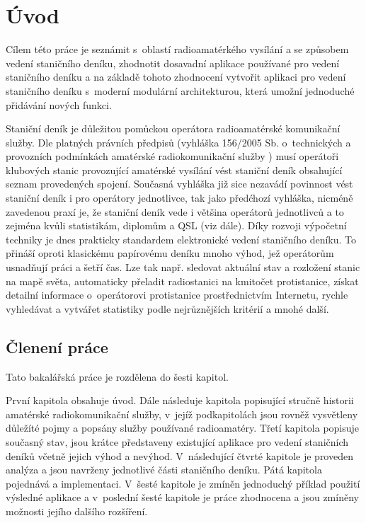 \chapter{Úvod}
\label{uvod}

Cílem této práce je seznámit s~oblastí radioamatérkého vysílání a se způsobem vedení staničního deníku,
zhodnotit dosavadní aplikace používané pro vedení staničního deníku a 
na základě tohoto zhodnocení vytvořit aplikaci pro vedení staničního deníku s~moderní modulární architekturou,
která umožní jednoduché přidávání nových funkci.

Staniční deník je důležitou pomůckou operátora radioamatérské komunikační
služby. Dle platných právních předpisů (vyhláška 156/2005 Sb. o~technických a
provozních podmínkách amatérské radiokomunikační služby \cite{vyhlaska})
musí operátoři klubových stanic provozující amatérské vysílání
vést staniční deník obsahující seznam provedených spojení.
Současná vyhláška již sice nezavádí povinnost vést staniční deník i pro
operátory jednotlivce, tak jako předćhozí vyhláška, 
nicméně zavedenou praxí je, že staniční deník vede i většina operátorů
jednotlivců a to zejména kvůli statistikám, diplomům a QSL (viz dále).
Díky rozvoji výpočetní techniky je dnes prakticky standardem
elektronické vedení staničního deníku.
To přináší oproti klasickému papírovému deníku mnoho výhod, jež
operátorům usnadňují práci a šetří čas. Lze tak např. sledovat aktuální stav a
rozložení stanic na mapě světa, automaticky přeladit radiostanici na kmitočet
protistanice, získat detailní informace o~operátorovi protistanice
prostřednictvím Internetu, rychle vyhledávat a vytvářet statistiky podle nejrůznějších kritérií a
mnohé další.

\section{Členení práce}

Tato bakalářská  práce je rozdělena do šesti kapitol.

První kapitola obsahuje úvod. Dále následuje kapitola popisující stručně historii amatérské radiokomunikační služby,
v~jejíž podkapitolách jsou rovněž vysvětleny důležíté pojmy a popsány služby používané radioamatéry.
Třetí kapitola popisuje současný stav, jsou krátce představeny existující
aplikace pro vedení staničních deníků včetně jejich výhod a nevýhod.
V~následující čtvrté kapitole je proveden analýza a jsou navrženy jednotlivé části staničního deníku.
Pátá kapitola pojednává a implementaci. V~šesté kapitole je zmíněn jednoduchý příklad použití výsledné aplikace
 a v~poslední šesté kapitole je práce zhodnocena a jsou zmíněny možnosti jejího
 dalšího rozšíření.


